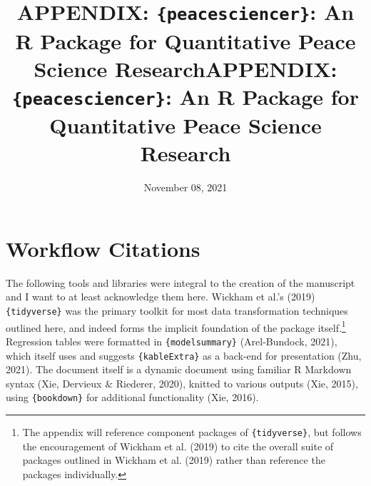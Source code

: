\documentclass[
  11pt,
]{article}
\title{APPENDIX: \texttt{\{peacesciencer\}}: An R Package for Quantitative Peace Science Research}
\author{}
\date{November 08, 2021}
\title{APPENDIX: \texttt{\{peacesciencer\}}: An R Package for Quantitative Peace Science Research }
\date{}
\begin{document}



{%
\setlength{\parindent}{0pt}
\thispagestyle{plain}
{%
\maketitle  %

}




{
   \vskip 13.5pt\relax \normalsize\fontsize{11}{12}
    

}

}






\vskip -8.5pt





\tableofcontents
\newpage

\hypertarget{workflow-citations}{%
\section{Workflow Citations}\label{workflow-citations}}

The following tools and libraries were integral to the creation of the manuscript and I want to at least acknowledge them here. Wickham et al.'s (2019) \texttt{\{tidyverse\}} was the primary toolkit for most data transformation techniques outlined here, and indeed forms the implicit foundation of the package itself.\footnote{The appendix will reference component packages of \texttt{\{tidyverse\}}, but follows the encouragement of Wickham et al. (2019) to cite the overall suite of packages outlined in Wickham et al. (2019) rather than reference the packages individually.} Regression tables were formatted in \texttt{\{modelsummary\}} (Arel-Bundock, 2021), which itself uses and suggests \texttt{\{kableExtra\}} as a back-end for presentation (Zhu, 2021). The document itself is a dynamic document using familiar R Markdown syntax (Xie, Dervieux \& Riederer, 2020), knitted to various outputs (Xie, 2015), using \texttt{\{bookdown\}} for additional functionality (Xie, 2016).
\end{document}
